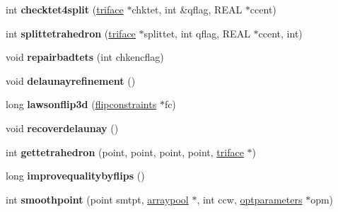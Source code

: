 \begin{DoxyCompactItemize}
\item 
\hypertarget{classtetgenmesh_ad4bfeb6c3c912f5d59f3e7784df98517}{int {\bfseries checktet4split} (\hyperlink{classtetgenmesh_1_1triface}{triface} $\ast$chktet, int \&qflag, R\-E\-A\-L $\ast$ccent)}\label{classtetgenmesh_ad4bfeb6c3c912f5d59f3e7784df98517}

\item 
\hypertarget{classtetgenmesh_aa752155eb1d18550a212dd40297f122e}{int {\bfseries splittetrahedron} (\hyperlink{classtetgenmesh_1_1triface}{triface} $\ast$splittet, int qflag, R\-E\-A\-L $\ast$ccent, int)}\label{classtetgenmesh_aa752155eb1d18550a212dd40297f122e}

\item 
\hypertarget{classtetgenmesh_a7c46c82d83099214115fa9719aefbd78}{void {\bfseries repairbadtets} (int chkencflag)}\label{classtetgenmesh_a7c46c82d83099214115fa9719aefbd78}

\item 
\hypertarget{classtetgenmesh_a477bbfde72103de66546d4ea3343b4a1}{void {\bfseries delaunayrefinement} ()}\label{classtetgenmesh_a477bbfde72103de66546d4ea3343b4a1}

\item 
\hypertarget{classtetgenmesh_a6755cfa20d8ea6ce62d059750657a292}{long {\bfseries lawsonflip3d} (\hyperlink{classtetgenmesh_1_1flipconstraints}{flipconstraints} $\ast$fc)}\label{classtetgenmesh_a6755cfa20d8ea6ce62d059750657a292}

\item 
\hypertarget{classtetgenmesh_a4f6f365744005e9d9da43a7d8a1fbba8}{void {\bfseries recoverdelaunay} ()}\label{classtetgenmesh_a4f6f365744005e9d9da43a7d8a1fbba8}

\item 
\hypertarget{classtetgenmesh_aeaa9ecb1ea77f736117b9dd6ee5855fc}{int {\bfseries gettetrahedron} (point, point, point, point, \hyperlink{classtetgenmesh_1_1triface}{triface} $\ast$)}\label{classtetgenmesh_aeaa9ecb1ea77f736117b9dd6ee5855fc}

\item 
\hypertarget{classtetgenmesh_a3d724f195ed9c3f5e1378d1f4f0c5282}{long {\bfseries improvequalitybyflips} ()}\label{classtetgenmesh_a3d724f195ed9c3f5e1378d1f4f0c5282}

\item 
\hypertarget{classtetgenmesh_a8edf1b91719a1e64acd4fe8617184905}{int {\bfseries smoothpoint} (point smtpt, \hyperlink{classtetgenmesh_1_1arraypool}{arraypool} $\ast$, int ccw, \hyperlink{classtetgenmesh_1_1optparameters}{optparameters} $\ast$opm)}\label{classtetgenmesh_a8edf1b91719a1e64acd4fe8617184905}


\end{DoxyCompactItemize}
